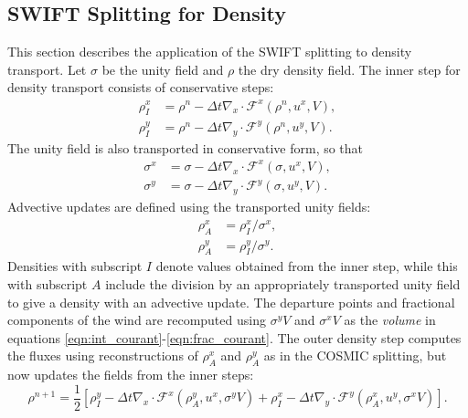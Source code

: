 \documentclass{ametsocV6.1}
\begin{document}
\subsection{SWIFT Splitting for Density} \label{sec:swift_density}
This section describes the application of the SWIFT splitting to density transport.
Let $\sigma$ be the unity field and $\rho$ the dry density field.
The inner step for density transport consists of conservative steps:
\begin{subequations} \label{eqn:swift_density_inner}
\begin{align} \label{eqn:swift_density_x}
    \rho_I^x &= \rho^n - \Delta{t} \nabla_x\cdot \mathcal{F}^x(\rho^n, u^x,V), \\
    \rho_I^y &= \rho^n - \Delta{t} \nabla_y\cdot \mathcal{F}^y(\rho^n, u^y,V).
\end{align}
\end{subequations}
The unity field is also transported in conservative form, so that
\begin{subequations} \label{eqn:sigma_x_sigma_y}
\begin{align}
    \sigma^x &= \sigma - \Delta{t} \nabla_x\cdot \mathcal{F}^x(\sigma, u^x,V), \\
    \sigma^y &= \sigma - \Delta{t} \nabla_y\cdot \mathcal{F}^y(\sigma, u^y,V).
\end{align}
\end{subequations}
Advective updates are defined using the transported unity fields:
\begin{subequations}
\begin{align} \label{eqn:swift_density_adv_x}
    \rho^x_A &= \rho_I^x / \sigma^x, \\ \label{eqn:swift_density_adv_y}
    \rho^y_A &= \rho_I^y / \sigma^y.
\end{align}
\end{subequations}
Densities with subscript $I$ denote values obtained from the inner step, while this with subscript $A$ include the division by an appropriately transported unity field to give a density with an advective update.
The departure points and fractional components of the wind are recomputed using $\sigma^yV$ and $\sigma^xV$ as the \textit{volume} in equations \eqref{eqn:int_courant}-\eqref{eqn:frac_courant}.
The outer density step computes the fluxes using reconstructions of $\rho^x_A$ and $\rho^y_A$ as in the COSMIC splitting, but now updates the fields from the inner steps:
\begin{equation} \label{eqn:swift_density}
\rho^{n+1} = \frac{1}{2}\left[\rho_I^{y} - \Delta{t}\nabla_x\cdot \mathcal{F}^x(\rho^y_A, u^x, \sigma^yV) + \rho_I^x - \Delta{t}\nabla_y\cdot \mathcal{F}^y(\rho^x_A, u^y, \sigma^xV)\right].
\end{equation}
\end{document}

